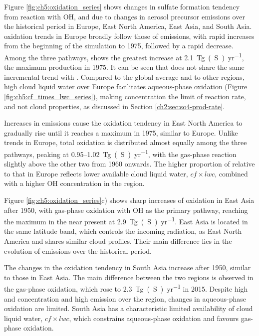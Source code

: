 Figure \ref{fig:ch5:oxidation_series} shows changes in sulfate formation tendency from  reaction with OH,  and  due to changes in aerosol precursor emissions over the historical period in Europe, East North America, East Asia, and South Asia.  oxidation trends in Europe broadly follow those of  emissions, with rapid increases from the beginning of the simulation to 1975, followed by a rapid decrease. Among the three pathways,  shows the greatest increase at \qty{2.1}{Tg(S)~yr^{-1}}, the maximum production in 1975. It can be seen that  does not share the same incremental trend with . Compared to the global average and to other regions, high cloud liquid water over Europe facilitates aqueous-phase oxidation (Figure \ref{fig:ch5:cf_times_lwc_series}), making  concentration the limit of reaction rate, and not cloud properties, as discussed in Section \ref{ch2:sec:so4-prod-rate}.

Increases in  emissions cause the  oxidation tendency in East North America to gradually rise until it reaches a maximum in 1975, similar to Europe. Unlike trends in Europe, total oxidation is distributed almost equally among the three pathways, peaking at 0.95--\qty{1.02}{Tg(S)~yr^{-1}}, with the gas-phase reaction slightly above the other two from 1960 onwards. The higher proportion of  relative to that in Europe reflects lower available cloud liquid water, $cf\times lwc$, combined with a higher OH concentration in the region. 

Figure \ref{fig:ch5:oxidation_series}c) shows sharp increases of  oxidation in East Asia after 1950, with gas-phase oxidation with OH as the primary pathway, reaching the maximum in the near present at \qty{2.9}{Tg(S)~yr^{-1}}. East Asia is located in the same latitude band, which controls the incoming radiation, as East North America and shares similar cloud profiles. Their main difference lies in the evolution of  emissions over the historical period.

The changes in the  oxidation tendency in South Asia increase after 1950, similar to those in East Asia. The main difference between the two regions is observed in the gas-phase oxidation, which rose to \qty{2.3}{Tg(S)~yr^{-1}} in 2015. Despite high  and  concentration and high  emission over the region, changes in aqueous-phase oxidation are limited. South Asia has a characteristic limited availability of cloud liquid water, $cf \times lwc$, which constrains aqueous-phase oxidation and favours gas-phase oxidation. 

